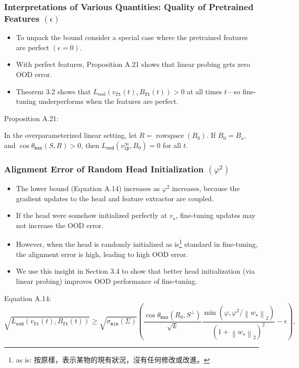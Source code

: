 \documentclass[16pt,aspectratio=169]{beamer}
\begin{document}
\begin{frame}
    \frametitle{Interpretations of Various Quantities: Quality of Pretrained Features $(\epsilon)$}

    \begin{itemize}
        \item To unpack the bound consider a special case where the pretrained features are perfect $(\epsilon=0)$. 
        \item With perfect features, Proposition A.21 shows that linear probing gets zero OOD error. 
        \item Theorem 3.2 shows that $L_{\text {ood}}\left(v_{\mathtt{ft}}(t), B_{\mathtt{ft}}(t)\right)>0$ at all times $t$---so fine-tuning underperforms when the features are perfect.
    \end{itemize}

    Proposition A.21:
    
    In the overparameterized linear setting, let $R=\operatorname{rowspace}(B_0)$. If $B_0 = B_\star$, and $\cos \theta_{\mathtt{max}}(S, R) > 0$, then $L_{\mathtt{ood}}(v_{\mathtt{lp}}^\infty, B_0) = 0$ for all $t$.

\end{frame}

\begin{frame}
    \frametitle{Alignment Error of Random Head Initialization $\left(\varphi^2\right)$}

    \begin{itemize}
        \item The lower bound (Equation A.14) increases as $\varphi^2$ increases, because the gradient updates to the head and feature extractor are coupled. 
        \item If the head were somehow initialized perfectly at $v_{\star}$, fine-tuning updates may not increase the OOD error.
        \item However, when the head is randomly initialized as is\footnote{as is: 按原樣，表示某物的現有狀況，沒有任何修改或改進。} standard in fine-tuning, the alignment error is high, leading to high OOD error.
        \item We use this insight in Section 3.4 to show that better head initialization (via linear probing) improves OOD performance of fine-tuning.
    \end{itemize}

    Equation A.14:
    $$
    \sqrt{L_{\mathtt{ood}}\left(v_{\mathtt{ft}}(t), B_{\mathtt{ft}}(t)\right)} \geq \sqrt{\sigma_{\mathtt{min}}(\Sigma)}\left(\frac{\cos \theta_{\mathtt{max}}\left(R_0, S^{\perp}\right)}{\sqrt{k}} \frac{\min \left(\varphi, \varphi^2 /\left\|w_{\star}\right\|_2\right)}{\left(1+\left\|w_{\star}\right\|_2\right)^2}-\epsilon\right),
    $$

\end{frame}
\end{document}
